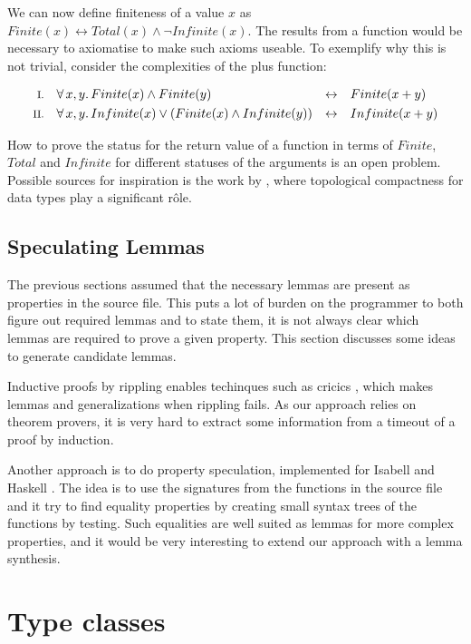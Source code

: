\pagebreak

We can now define finiteness of a value $x$ as
$Finite(x) \leftrightarrow Total(x) \wedge \neg Infinite(x)$.  The results
from a function would be necessary to axiomatise to make such axioms
useable. To exemplify why this is not trivial, consider the
complexities of the plus function:

\begin{align*}
\rom{1} && \faa{x}{y} & Finite(x) \wedge Finite(y)                  & \leftrightarrow &&& Finite(x + y) \\
\rom{2} && \faa{x}{y} & Infinite(x) \vee (Finite(x) \wedge Infinite(y)) & \leftrightarrow &&& Infinite(x + y)
\end{align*}

How to prove the status for the return value of a function in terms of
$Finite$, $Total$ and $Infinite$ for different statuses of the arguments is
an open problem. Possible sources for inspiration is the work by
\cite{exhaustiblesets}, where topological compactness for
data types play a significant r\^{o}le.

\subsection{Speculating Lemmas}

The previous sections assumed that the necessary lemmas are present as
properties in the source file. This puts a lot of burden on the
programmer to both figure out required lemmas and to state them, it is
not always clear which lemmas are required to prove a given
property. This section discusses some ideas to generate candidate
lemmas.

Inductive proofs by rippling enables techinques such as cricics
\citep{productiveuse}, which makes lemmas and generalizations when
rippling fails. As our approach relies on theorem provers, it is very
hard to extract some information from a timeout of a proof by induction.

Another approach is to do property speculation, implemented for
Isabell \cite{isacosy} and Haskell \cite{quickspec}. The idea is to
use the signatures from the functions in the source file and it try to
find equality properties by creating small syntax trees of the
functions by testing. Such equalities are well suited as lemmas for
more complex properties, and it would be very interesting to extend
our approach with a lemma synthesis.


\section{Type classes}
\label{sec:typeclasses}

